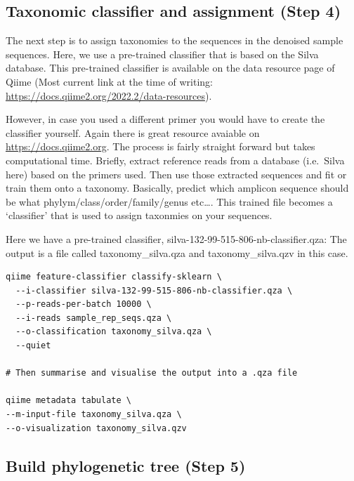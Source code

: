\documentclass[
]{book}
\begin{document}
\hfill\break

\hypertarget{taxonomic-classifier-and-assignment-step-4}{%
\subsection{Taxonomic classifier and assignment (Step 4)}\label{taxonomic-classifier-and-assignment-step-4}}

The next step is to assign taxonomies to the sequences in the denoised sample sequences. Here, we use a pre-trained classifier that is based on the Silva database. This pre-trained classifier is available on the data resource page of Qiime (Most current link at the time of writing: \url{https://docs.qiime2.org/2022.2/data-resources}).

However, in case you used a different primer you would have to create the classifier yourself. Again there is great resource avaiable on \url{https://docs.qiime2.org}. The process is fairly straight forward but takes computational time. Briefly, extract reference reads from a database (i.e.~Silva here) based on the primers used. Then use those extracted sequences and fit or train them onto a taxonomy. Basically, predict which amplicon sequence should be what phylym/class/order/family/genus etc\ldots. This trained file becomes a `classifier' that is used to assign taxonmies on your sequences.

Here we have a pre-trained classifier, silva-132-99-515-806-nb-classifier.qza:
The output is a file called taxonomy\_silva.qza and taxonomy\_silva.qzv in this case.

\begin{verbatim}
qiime feature-classifier classify-sklearn \
  --i-classifier silva-132-99-515-806-nb-classifier.qza \
  --p-reads-per-batch 10000 \
  --i-reads sample_rep_seqs.qza \
  --o-classification taxonomy_silva.qza \
  --quiet

# Then summarise and visualise the output into a .qza file

qiime metadata tabulate \
--m-input-file taxonomy_silva.qza \
--o-visualization taxonomy_silva.qzv
\end{verbatim}

\hfill\break

\hypertarget{build-phylogenetic-tree-step-5}{%
\subsection{Build phylogenetic tree (Step 5)}\label{build-phylogenetic-tree-step-5}}
\end{document}
